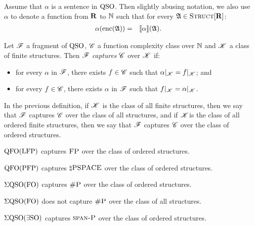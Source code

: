 
Assume that $\alpha$ is a sentence in ${\rm QSO}$. Then slightly abusing notation, we also use $\alpha$ to denote a function from $\mathbf{R}$ to $\mathbb{N}$ such that for every $\mathfrak{A} \in \text{\sc Struct}[\mathbf{R}] $:
\begin{eqnarray*}
	\alpha({\rm enc}(\mathfrak{A})) & = & {\llbracket{}{\alpha}\rrbracket}(\mathfrak{A}).
\end{eqnarray*}
\begin{definition}
	Let $\mathscr{F}$ a fragment of ${\rm QSO}$, $\mathscr{C}$ a function complexity class over $\mathbb{N}$ and $\mathscr{K}$ a class of finite structures. Then $\mathscr{F}$ {\em captures} $\mathscr{C}$ over $\mathscr{K}$ if:
	\begin{itemize}
		\item for every $\alpha$ in $\mathscr{F}$, there exists $f \in \mathscr{C}$ such that $\alpha|_{\mathscr{K}} = f|_{\mathscr{K}}$; and
		
		\item for every $f \in \mathscr{C}$, there exists $\alpha$ in $\mathscr{F}$ such that $f|_{\mathscr{K}} = \alpha|_{\mathscr{K}}$.
	\end{itemize}
\end{definition}
In the previous definition, if $\mathscr{K}$ is the class of all finite structures, then we say that $\mathscr{F}$ captures $\mathscr{C}$ over the class of all structures, and if $\mathscr{K}$is the class of all ordered finite structures, then we say that $\mathscr{F}$ captures $\mathscr{C}$ over the class of ordered structures.

\begin{theorem} \label{captfp}
	${\rm QFO}({\rm LFP})$ captures $\text{\sc FP}$ over the class of ordered structures.
\end{theorem}

\begin{theorem} \label{qfo-pfp-cap}
	${\rm QFO}({\rm PFP})$ captures $\natural\text{\sc PSPACE}$ over the class of ordered structures.
\end{theorem}

\begin{theorem} \label{eqso-fo-cap}
	$\Sigma{\rm QSO}({\rm FO})$ captures $\text{\sc \#P}$ over the class of ordered structures.
\end{theorem}

\begin{proposition} \label{eqso-fo-cap-not}
	$\Sigma{\rm QSO}({\rm FO})$ does not capture $\text{\sc \#P}$ over the class of all structures.
\end{proposition}

\begin{theorem} \label{eqso-eso-cap}
	$\Sigma{\rm QSO}(\exists{\rm SO})$ captures $\text{\sc span-P}$ over the class of ordered structures.
\end{theorem}
